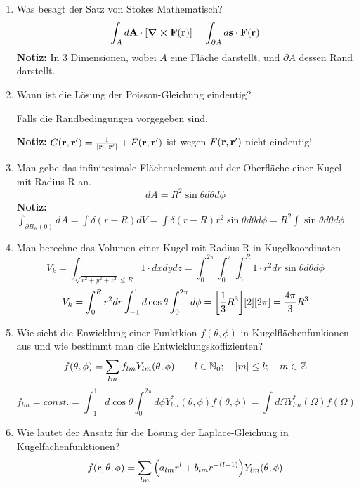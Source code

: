 \documentclass{scrartcl}
\newcommand{\rr}[1]{\frac{#1}{\abs{\vb{r}-\vb{r}'}}}
\newcommand{\ds}{\displaystyle}
\begin{document}
\begin{enumerate}
    \item Was besagt der Satz von Stokes Mathematisch?
          $$\ds \int_A d\vb A \cdot \qty[\curl \vb F(\vb r)]=
           \int_{\partial A}d\vb s\cdot \vb F(\vb r)$$
          \textbf{Notiz:} In 3 Dimensionen, wobei $A$ eine Fläche 
          darstellt,
          und $\partial A$ dessen Rand darstellt.

    \item Wann ist die Lösung der Poisson-Gleichung eindeutig?
          \begin{center}
            Falls die Randbedingungen vorgegeben sind.
          \end{center}
          \textbf{Notiz:} $G(\vb r, \vb r')=\rr{1} + F(\vb r, \vb r')$ 
          ist wegen $F(\vb r, \vb r')$ nicht eindeutig!
          
    \item Man gebe das infinitesimale Flächenelement auf der Oberfläche 
          einer Kugel mit Radius R an.
          $$\ds dA = R^2\sin\theta d\theta d\phi$$
          \textbf{Notiz:} $\ds\int_{\partial B_R(0)} dA=\int\delta(r-R)dV
           =\int \delta(r-R)r^2\sin\theta d\theta d\phi
           =R^2 \int \sin\theta d\theta d\phi$

    \item Man berechne das Volumen einer Kugel mit Radius R 
          in Kugelkoordinaten\\
          $$\ds V_k=\int_{\sqrt{x^2+y^2+z^2}\le R} 1\cdot dxdydz
           =\int_0^{2\pi}\int_0^\pi\int_0^R 1\cdot r^2dr 
            \sin\theta d\theta d\phi$$
          $$\ds V_k=\int_0^R r^2 dr \int_{-1}^{1} d\cos\theta 
                   \int_0^{2\pi}d\phi
           =\qty[\frac{1}{3}R^3]\qty[2]\qty[2\pi]=\frac{4\pi}{3}R^3$$

    \item Wie sieht die Enwicklung einer Funktkion $f(\theta,\phi)$ in
          Kugelflächenfunkionen aus und wie bestimmt man die 
          Entwicklungskoffizienten?
          $$\ds f(\theta, \phi)=\sum_{lm} f_{lm}Y_{lm}(\theta,\phi)
          \qquad l\in \mathbb{N}_0;\quad \abs{m}\le l; 
          \quad m\in\mathbb{Z}$$
          $$\ds f_{lm}=const.
           =\int_{-1}^{1} d\cos\theta\int_0^{2\pi}d\phi 
           Y^*_{lm}(\theta,\phi)f(\theta,\phi)
           =\int d\Omega Y^*_{lm}(\Omega)f(\Omega)$$

    \item Wie lautet der Ansatz für die Lösung der Laplace-Gleichung in
          Kugelfächenfunktionen?\\
          $$f(r,\theta,\phi)=
          \sum_{lm}\qty(a_{lm}r^l+b_{lm}r^{-(l+1)})Y_{lm}(\theta,\phi)$$
           

\end{enumerate}
\end{document}
